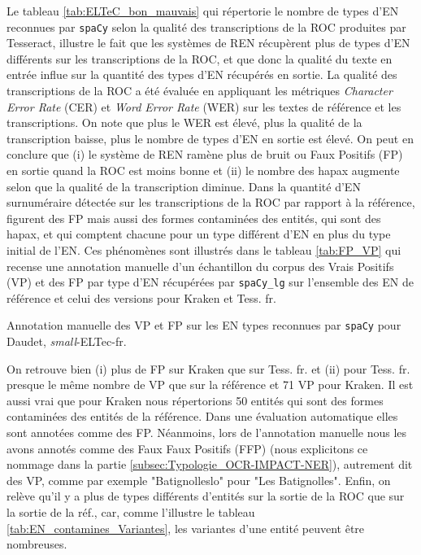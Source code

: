 Le tableau \ref{tab:ELTeC_bon_mauvais} qui répertorie le nombre de types d'EN reconnues par \texttt{spaCy} selon la qualité des transcriptions de la ROC produites par Tesseract, illustre le fait que les systèmes de REN récupèrent plus de types d'EN différents sur les transcriptions de la ROC, et que donc la qualité du texte en entrée influe sur la quantité des types d'EN récupérés en sortie. La qualité des transcriptions de la ROC a été évaluée en appliquant les métriques \textit{Character Error Rate} (CER) et \textit{Word Error Rate} (WER) sur les textes de référence et les transcriptions. On note que plus le WER est élevé, plus la qualité de la transcription baisse, plus le nombre de types d'EN en sortie est élevé. On peut en conclure que (i) le système de REN ramène plus de bruit ou Faux Positifs (FP) en sortie quand la ROC est moins bonne et (ii) le nombre des hapax augmente selon que la qualité de la transcription diminue. 
Dans la quantité d'EN surnuméraire détectée sur les transcriptions de la ROC par rapport à la référence, figurent des FP mais aussi des formes contaminées des entités, qui sont des hapax, et qui comptent chacune pour un type différent d'EN en plus du type initial de l'EN. Ces phénomènes sont illustrés dans le tableau \ref{tab:FP_VP} qui recense une annotation manuelle d'un échantillon du corpus
des Vrais Positifs (VP) et des FP par type d'EN récupérées par \texttt{spaCy\_lg} sur l'ensemble des EN de référence et celui des versions pour Kraken et Tess. fr. 
\begin{table}[h!]
\small
    \centering
    
    \caption{Annotation manuelle des VP et FP sur les EN types reconnues par \texttt{spaCy} pour Daudet, \textit{small}-ELTec-fr.}
    \label{tab:FP_VP}
\end{table}

On retrouve bien (i) plus de FP sur Kraken que sur Tess. fr. et (ii) pour Tess. fr. presque le même nombre de VP que sur la référence et 71 VP pour Kraken. Il est aussi vrai que pour Kraken nous répertorions 50 entités qui sont des formes contaminées des entités de la référence. Dans une évaluation automatique elles sont annotées comme des FP. Néanmoins, lors de l'annotation manuelle nous les avons annotés comme des Faux Faux Positifs (FFP) (nous explicitons ce nommage dans la partie \ref{subsec:Typologie_OCR-IMPACT-NER}), autrement dit des VP, comme par exemple "Batignolleslo" pour "Les Batignolles". Enfin, on relève qu'il y a plus de types différents d'entités sur la sortie de la ROC que sur la sortie de la réf., car, comme l'illustre le tableau \ref{tab:EN_contamines_Variantes}, les variantes d'une entité peuvent être nombreuses. 

